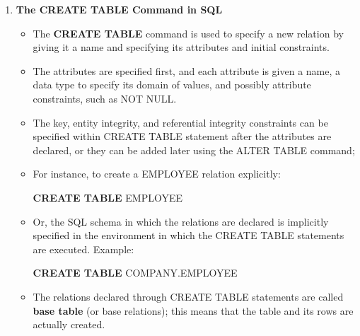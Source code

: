 \documentclass[10pt]{article}
\begin{document}
\begin{enumerate}
	\item \textbf{The CREATE TABLE Command in SQL}
	\begin{itemize}
		\item The \textbf{CREATE TABLE} command is used to specify a new relation by giving it a name and specifying its attributes and initial constraints.
		\item The attributes are specified first, and each attribute is given a name, a data type to specify its domain of values, and possibly attribute constraints, such as NOT NULL.
		\item The key, entity integrity, and referential integrity constraints can be specified within CREATE TABLE statement after the attributes are declared, or they can be added later using the ALTER TABLE command;
		\item For instance, to create a EMPLOYEE relation explicitly:
		\begin{center}
			\textbf{CREATE TABLE} EMPLOYEE
		\end{center}
		\item Or, the SQL schema in which the relations are declared is implicitly specified in the environment in which the CREATE TABLE statements are executed. Example:
		\begin{center}
			\textbf{CREATE TABLE} COMPANY.EMPLOYEE
		\end{center}
		\item The relations declared through CREATE TABLE statements are called \textbf{base table} (or base relations); this means that the table and its rows are actually created.
	\end{itemize}
\end{enumerate}
\end{document}
